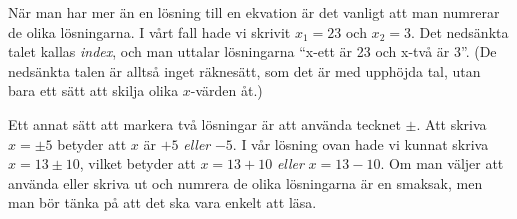 När man har mer än en lösning till en ekvation är det vanligt att man numrerar de olika lösningarna.
I vårt fall hade vi skrivit $x_1=23$ och $x_2=3$.
Det nedsänkta talet kallas \emph{index}, och man uttalar lösningarna ``x-ett är 23 och x-två är 3''.
(De nedsänkta talen är alltså inget räknesätt, som det är med upphöjda tal, utan bara ett sätt att skilja olika $x$-värden åt.)

Ett annat sätt att markera två lösningar är att använda tecknet $\pm$.
Att skriva $x=\pm 5$ betyder att $x$ är $+5$ \emph{eller} $-5$.
I vår lösning ovan hade vi kunnat skriva $x=13 \pm 10$, vilket betyder att $x=13+10$ \emph{eller} $x=13-10$.
Om man väljer att använda \pm eller skriva ut och numrera de olika lösningarna är en smaksak, men man bör tänka på att det ska vara enkelt att läsa.
